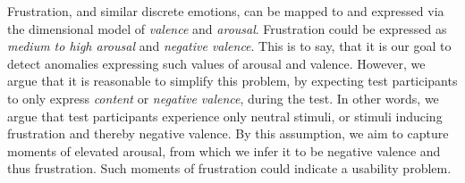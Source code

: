 Frustration, and similar discrete emotions, can be mapped to and expressed via the dimensional model of \textit{valence}
and \textit{arousal}. Frustration could be expressed as \textit{medium to high arousal} and \textit{negative
  valence}. This is to say, that it is our goal to detect anomalies expressing such values of arousal and
valence. However, we argue that it is reasonable to simplify this problem, by expecting test participants to only
express \textit{content} or \textit{negative valence}, during the test. In other words, we argue that test participants
experience only neutral stimuli, or stimuli inducing frustration and thereby negative valence. By this assumption, we
aim to capture moments of elevated arousal, from which we infer it to be negative valence and thus frustration.
Such moments of frustration could indicate a usability problem.

